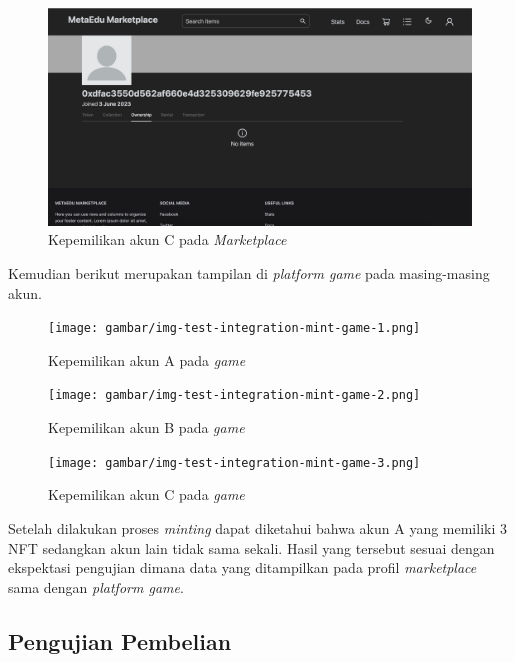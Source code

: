   \begin{figure} [H] \centering
            \includegraphics[scale=0.2]{gambar/img-test-integration-mint-profile-3.png}
            \caption{Kepemilikan akun C pada \emph{Marketplace}}
            \label{fig:TestIntegrationMintingProfile3}
        \end{figure}

Kemudian berikut merupakan tampilan di \emph{platform game} pada masing-masing akun.

\begin{figure} [H] \centering
            \texttt{[image: gambar/img-test-integration-mint-game-1.png]}
            \caption{Kepemilikan akun A pada \emph{game}}
            \label{fig:TestIntegrationMintingGame1}
        \end{figure}

\begin{figure} [H] \centering
            \texttt{[image: gambar/img-test-integration-mint-game-2.png]}
            \caption{Kepemilikan akun B pada \emph{game}}
            \label{fig:TestIntegrationMintingGame2}
        \end{figure}
        
\begin{figure} [H] \centering
            \texttt{[image: gambar/img-test-integration-mint-game-3.png]}
            \caption{Kepemilikan akun C pada \emph{game}}
            \label{fig:TestIntegrationMintingGame3}
        \end{figure}

Setelah dilakukan proses \emph{minting} dapat diketahui bahwa akun A yang memiliki 3 NFT sedangkan akun lain tidak sama sekali. Hasil yang tersebut sesuai dengan ekspektasi pengujian dimana data yang ditampilkan pada profil \emph{marketplace} sama dengan \emph{platform game}. 

\subsection{Pengujian Pembelian}

